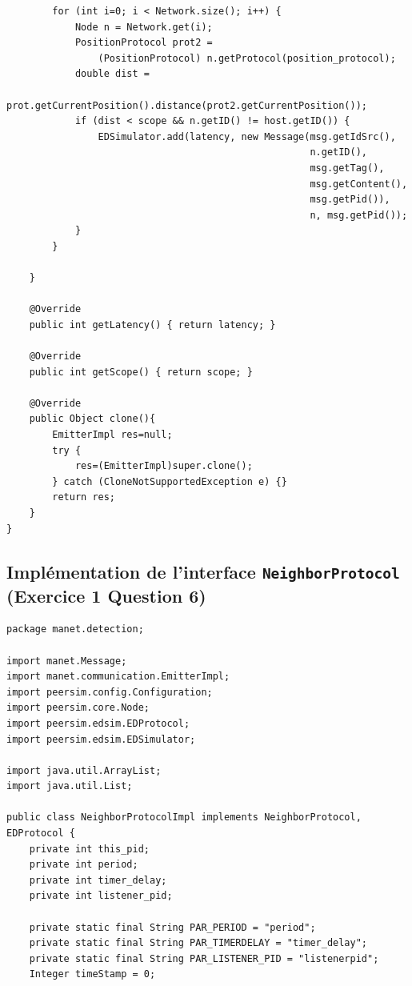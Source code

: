 \documentclass[a4paper]{article}
\begin{document}
\begin{appendix}
\begin{lstlisting}
        for (int i=0; i < Network.size(); i++) {
            Node n = Network.get(i);
            PositionProtocol prot2 =
                (PositionProtocol) n.getProtocol(position_protocol);
            double dist =
                prot.getCurrentPosition().distance(prot2.getCurrentPosition());
            if (dist < scope && n.getID() != host.getID()) {
                EDSimulator.add(latency, new Message(msg.getIdSrc(),
                                                     n.getID(),
                                                     msg.getTag(),
                                                     msg.getContent(),
                                                     msg.getPid()),
                                                     n, msg.getPid());
            }
        }

    }

    @Override
    public int getLatency() { return latency; }

    @Override
    public int getScope() { return scope; }

    @Override
    public Object clone(){
        EmitterImpl res=null;
        try {
            res=(EmitterImpl)super.clone();
        } catch (CloneNotSupportedException e) {}
        return res;
    }
}
\end{lstlisting}

\subsection{Implémentation de l'interface \texttt{NeighborProtocol}
  (Exercice 1 Question 6)}


\begin{lstlisting}
package manet.detection;

import manet.Message;
import manet.communication.EmitterImpl;
import peersim.config.Configuration;
import peersim.core.Node;
import peersim.edsim.EDProtocol;
import peersim.edsim.EDSimulator;

import java.util.ArrayList;
import java.util.List;

public class NeighborProtocolImpl implements NeighborProtocol, EDProtocol {
    private int this_pid;
    private int period;
    private int timer_delay;
    private int listener_pid;

    private static final String PAR_PERIOD = "period";
    private static final String PAR_TIMERDELAY = "timer_delay";
    private static final String PAR_LISTENER_PID = "listenerpid";
    Integer timeStamp = 0;


\end{lstlisting}
\end{appendix}
\end{document}
